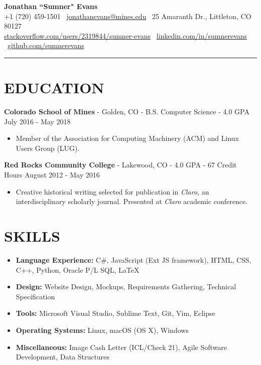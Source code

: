 \documentclass[10.5pt,letterpaper]{article}
\begin{document}
\begin{center}
    \huge\textbf{Jonathan ``Sumner" Evans}\\
    \vspace{3pt}
    \small +1 (720) 459-1501
    \textbar\ \href{mailto:jonathanevans@mines.edu}{jonathanevans@mines.edu}
    \textbar\ 25 Amaranth Dr., Littleton, CO 80127 \\
    \href{http://stackoverflow.com/users/2319844/sumner-evans}{stackoverflow.com/users/2319844/sumner-evans}
    \textbar\ \href{https://www.linkedin.com/in/sumnerevans}{linkedin.com/in/sumnerevans}
    \textbar\ \href{https://github.com/sumnerevans}{github.com/sumnerevans}
    \rule{\textwidth}{0.5pt}
\end{center}

\section*{EDUCATION}
\textbf{Colorado School of Mines} - Golden, CO - B.S. Computer Science - 4.0 GPA \hfill
July 2016 - May 2018
\begin{itemize}
    \item Member of the Association for Computing Machinery (ACM) and Linux Users Group (LUG).
\end{itemize}

\vspace{4pt}\textbf{Red Rocks Community College} - Lakewood, CO - 4.0 GPA - 67 Credit Hours \hfill
August 2012 - May 2016
\begin{itemize}
    \item Creative historical writing selected for publication in \textit{Claro}, an
        interdisciplinary scholarly journal. Presented at \textit{Claro} academic conference.
\end{itemize}

\section*{SKILLS}
{
    \renewcommand\labelitemi{}
    \renewcommand\leftmargini{0pt}
    \begin{itemize}
        \item \textbf{Language Experience:} C\#, JavaScript (Ext JS framework), HTML, CSS, C++,
            Python, Oracle P/L SQL, LaTeX
        \item \textbf{Design:} Website Design, Mockups, Requirements Gathering, Technical
            Specification
        \item \textbf{Tools:} Microsoft Visual Studio, Sublime Text, Git, Vim, Eclipse
        \item \textbf{Operating Systems:} Linux, macOS (OS X), Windows
        \item \textbf{Miscellaneous:} Image Cash Letter (ICL/Check 21), Agile Software Development,
            Data Structures
    \end{itemize}
}
\end{document}
